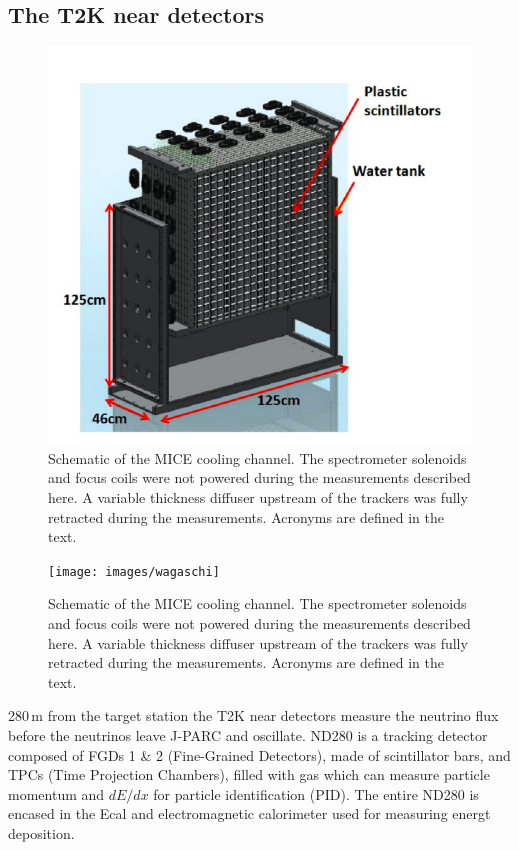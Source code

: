 \documentclass[%
 reprint,
 amsmath,amssymb,
 aps,
]{revtex4-2}
\begin{document}
\subsection{The T2K near detectors}
\begin{figure}[htbp]
\begin{center}
\includegraphics[width=\textwidth]{images/wagasci}
\end{center}
\caption{Schematic of the MICE cooling channel. The spectrometer solenoids and focus coils were not powered during the measurements described here. A variable thickness diffuser upstream of the trackers was fully retracted during the measurements. Acronyms are defined in the text.}
\label{fig:micecc}
\end{figure}
\begin{figure}[htbp]
\begin{center}
\texttt{[image: images/wagaschi]}
\end{center}
\caption{Schematic of the MICE cooling channel. The spectrometer solenoids and focus coils were not powered during the measurements described here. A variable thickness diffuser upstream of the trackers was fully retracted during the measurements. Acronyms are defined in the text.}
\label{fig:micecc}
\end{figure}

280\,m from the target station the T2K near detectors measure the neutrino flux before the neutrinos leave J-PARC and oscillate. ND280 is a tracking detector composed of FGDs 1 \& 2 (Fine-Grained Detectors), made of scintillator bars, and TPCs (Time Projection Chambers), filled with gas which can measure particle momentum and $dE/dx$ for particle identification (PID). The entire ND280 is encased in the Ecal and electromagnetic calorimeter used for measuring energt deposition. 
\end{document}
